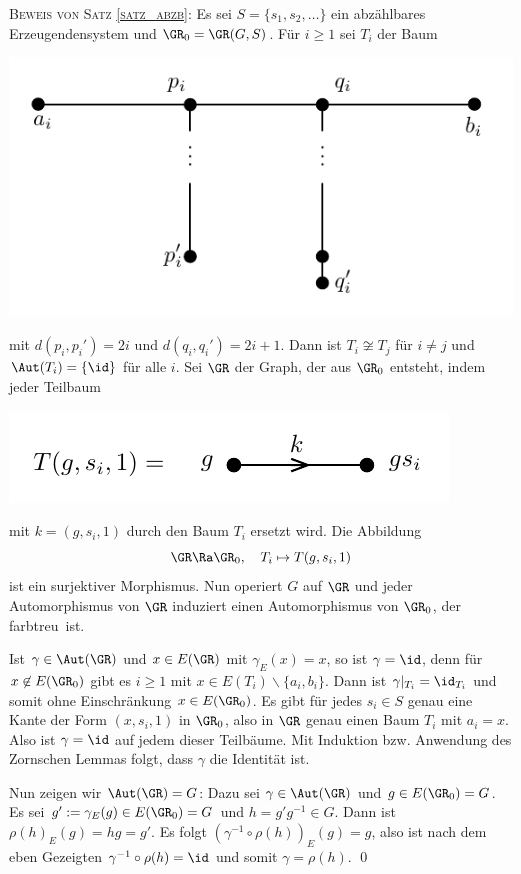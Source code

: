 \textsc{Beweis von Satz \ref{satz_abzb}:}
Es sei $S=\{s_1, s_2, \ldots\}$ ein abzählbares Erzeugendensystem
und $\GR_0=\GR(G,S)$.
Für $i\geq 1$ sei $T_i$ der Baum
\begin{center}
	\includegraphics{grugraImages/Ti}
\end{center}
mit $d(p_i,p_i')=2i$ und $d(q_i,q_i')=2i+1$.
Dann ist $T_i\not\cong T_j$ für $i\neq j$ und $\Aut(T_i)=\{\id\}$
für alle $i$. Sei $\GR$ der Graph, der aus $\GR_0$ entsteht, indem
jeder Teilbaum
\begin{center}
	\includegraphics{grugraImages/ggsi}
\end{center}
mit $k=(g,s_i,1)$ durch den Baum $T_i$ ersetzt wird.
Die Abbildung
\[
\GR\Ra\GR_0,\quad T_i\mapsto T(g,s_i,1)
\]
ist ein surjektiver Morphismus.
Nun operiert $G$ auf $\GR$ und jeder Automorphismus von $\GR$
induziert einen Automorphismus von $\GR_0$, der \glqq farbtreu\grqq\
ist.

Ist $\gamma\in\Aut(\GR)$ und $x\in E(\GR)$ mit $\gamma_E(x)=x$,
so ist $\gamma=\id$, denn für $x\not\in E(\GR_0)$ gibt es $i\geq 1$
mit $x\in E(T_i)\backslash\{a_i,b_i\}$.
Dann ist $\gamma|_{T_i}=\id_{T_i}$ und somit ohne Einschränkung
$x\in E(\GR_0)$. Es gibt für jedes $s_i\in S$ genau eine Kante der
Form $(x,s_i,1)$ in $\GR_0$, also in $\GR$ genau einen Baum $T_i$
mit $a_i=x$. Also ist $\gamma=\id$ auf jedem dieser Teilbäume.
Mit Induktion bzw. Anwendung des Zornschen Lemmas folgt, dass
$\gamma$ die Identität ist.

Nun zeigen wir $\Aut(\GR)=G$: Dazu sei $\gamma\in\Aut(\GR)$ und
$g\in E(\GR_0)=G$. Es sei $g':=\gamma_E(g)\in E(\GR_0)=G$
und $h=g'g^{-1}\in G$. Dann ist $\rho(h)_E(g)=hg=g'$.
Es folgt $(\gamma^{-1}\circ\rho(h))_E(g)=g$, also
ist nach dem eben Gezeigten $\gamma^{-1}\circ\rho(h)=\id$ und somit
$\gamma=\rho(h)$.
\qed

